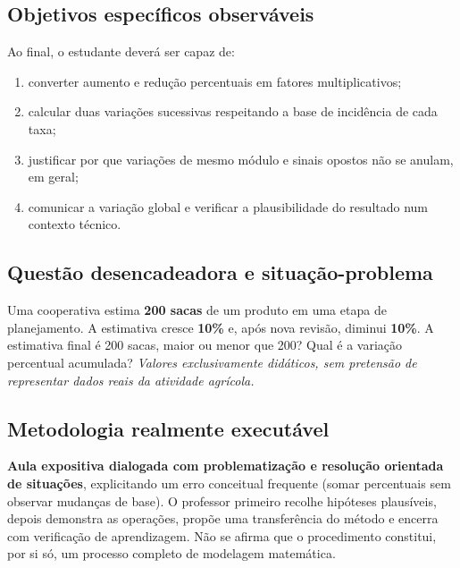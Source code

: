 \documentclass[11pt,a4paper]{article}
\begin{document}
\subsection*{Objetivos específicos observáveis}
Ao final, o estudante deverá ser capaz de:
\begin{enumerate}[label=(\alph*)]
\item converter aumento e redução percentuais em fatores multiplicativos;
\item calcular duas variações sucessivas respeitando a base de incidência de cada taxa;
\item justificar por que variações de mesmo módulo e sinais opostos não se anulam, em geral;
\item comunicar a variação global e verificar a plausibilidade do resultado num contexto técnico.
\end{enumerate}

\subsection*{Questão desencadeadora e situação-problema}
Uma cooperativa estima \textbf{200 sacas} de um produto em uma etapa de planejamento. A estimativa cresce \textbf{10\%} e, após nova revisão, diminui \textbf{10\%}. A estimativa final é 200 sacas, maior ou menor que 200? Qual é a variação percentual acumulada? \textit{Valores exclusivamente didáticos, sem pretensão de representar dados reais da atividade agrícola.}

\subsection*{Metodologia realmente executável}
\textbf{Aula expositiva dialogada com problematização e resolução orientada de situações}, explicitando um erro conceitual frequente (somar percentuais sem observar mudanças de base). O professor primeiro recolhe hipóteses plausíveis, depois demonstra as operações, propõe uma transferência do método e encerra com verificação de aprendizagem. Não se afirma que o procedimento constitui, por si só, um processo completo de modelagem matemática.
\end{document}
